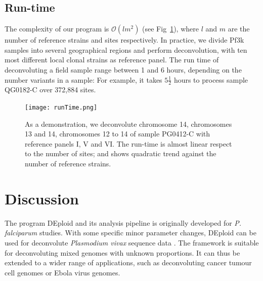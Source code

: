 \documentclass{bioinfo}
\begin{document}

\subsection{Run-time}
The complexity of our program is $\mathcal{O}(lm^2)$ (see Fig~\ref{fig:runtime}), where $l$ and $m$ are the number of reference strains and sites respectively. In practice, we divide Pf3k samples into several geographical regions and perform deconvolution, with ten most different local clonal strains as reference panel. The run time of deconvoluting a field sample range between 1 and 6 hours, depending on the number variants in a sample: For example, it takes $5\frac{1}{2}$ hours to process sample {\textmd QG0182-C} over 372,884 sites.


\begin{figure}[ht]
\centering
\texttt{[image: runTime.png]}
\caption{As a demonstration, we deconvolute chromosome 14, chromosomes 13 and 14, chromosomes 12 to 14 of sample {\textmd PG0412-C} with reference panels I, V and VI. The run-time is almost linear respect to the number of sites; and shows quadratic trend against the number of reference strains.}\label{fig:runtime}
\end{figure}



\section{Discussion}
The program DEploid and its analysis pipeline is originally developed for {\it P. falciparum} studies. With some specific minor parameter changes, DEploid can be used for deconvolute {\it Plasmodium vivax} sequence data \citep{Pearson2016}. The framework is suitable for deconvoluting mixed genomes with unknown proportions. It can thus be extended to a wider range of applications, such as deconvoluting cancer tumour cell genomes or Ebola virus genomes.
\end{document}
